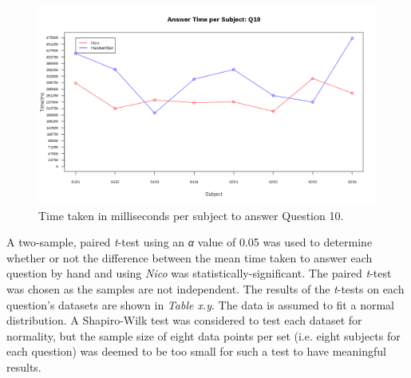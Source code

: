 \documentclass[12pt,twoside,notitlepage,xetex]{report}
\begin{document}
\begin{center}
\begin{figure}[H]
\begin{center}
\includegraphics[width=\textwidth-2cm]{figs/graphs/q10.png}
\end{center}
\caption{Time taken in milliseconds per subject to answer Question 10.}
\end{figure}
\end{center}

A two-sample, paired \emph{t}-test using an \emph{α} value of 0.05 was used to
determine whether or not the difference between the mean time taken to answer
each question by hand and using \emph{Nico} was statistically-significant.  The
paired \emph{t}-test was chosen as the samples are not independent.  The
results of the \emph{t}-tests on each question's datasets are shown in
\emph{Table x.y}.  The data is assumed to fit a normal distribution.  A
Shapiro-Wilk test was considered to test each dataset for normality, but the
sample size of eight data points per set (i.e. eight subjects for each
question) was deemed to be too small for such a test to have meaningful results.
\end{document}
